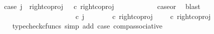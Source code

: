 \begin{isabellebody}
\ \ \ \ \ \ \isamarkupfalse%
\ \isamarkupfalse%
\ case{}{\isacharcolon}{\kern0pt}\ {\isachardoublequoteopen}j\ {\isacharequal}{\kern0pt}\ right{\isacharunderscore}{\kern0pt}coproj\ {\isasymone}\ {\isacharparenleft}{\kern0pt}{\isasymone}{\isasymCoprod}{\isasymone}{\isacharparenright}{\kern0pt}\ {\isasymcirc}\isactrlsub c\ right{\isacharunderscore}{\kern0pt}coproj\ {\isasymone}\ {\isasymone}{\isachardoublequoteclose}\isanewline
\ \ \ \ \ \ \ \ \isamarkupfalse%
\ case{}{\isacharunderscore}{\kern0pt}or{\isacharunderscore}{\kern0pt}{}\ \isamarkupfalse%
\ blast\isanewline
\ \ \ \ \ \ \isamarkupfalse%
\ {\isachardoublequoteopen}{\isasymlangle}{\isasymf}{\isacharcomma}{\kern0pt}\ {\isasymt}{\isasymrangle}\ {\isacharequal}{\kern0pt}\ {\isasymlangle}{\isasymf}{\isacharcomma}{\kern0pt}{\isasymf}{\isasymrangle}{\isachardoublequoteclose}\isanewline
\ \ \ \ \ \ \isamarkupfalse%
\ {\isacharminus}{\kern0pt}\ \isanewline
\ \ \ \ \ \ \ \ \isamarkupfalse%
\ {\isachardoublequoteopen}{\isacharparenleft}{\kern0pt}{\isasymlangle}{\isasymt}{\isacharcomma}{\kern0pt}\ {\isasymt}{\isasymrangle}{\isasymamalg}\ {\isacharparenleft}{\kern0pt}{\isasymlangle}{\isasymt}{\isacharcomma}{\kern0pt}\ {\isasymf}{\isasymrangle}\ {\isasymamalg}{\isasymlangle}{\isasymf}{\isacharcomma}{\kern0pt}\ {\isasymt}{\isasymrangle}{\isacharparenright}{\kern0pt}{\isacharparenright}{\kern0pt}\ {\isasymcirc}\isactrlsub c\ j\ {\isacharequal}{\kern0pt}\ {\isacharparenleft}{\kern0pt}{\isacharparenleft}{\kern0pt}{\isasymlangle}{\isasymt}{\isacharcomma}{\kern0pt}\ {\isasymt}{\isasymrangle}{\isasymamalg}\ {\isacharparenleft}{\kern0pt}{\isasymlangle}{\isasymt}{\isacharcomma}{\kern0pt}\ {\isasymf}{\isasymrangle}\ {\isasymamalg}{\isasymlangle}{\isasymf}{\isacharcomma}{\kern0pt}\ {\isasymt}{\isasymrangle}{\isacharparenright}{\kern0pt}{\isacharparenright}{\kern0pt}\ {\isasymcirc}\isactrlsub c\ right{\isacharunderscore}{\kern0pt}coproj\ {\isasymone}\ {\isacharparenleft}{\kern0pt}{\isasymone}\ {\isasymCoprod}\ {\isasymone}{\isacharparenright}{\kern0pt}{\isacharparenright}{\kern0pt}\ {\isasymcirc}\isactrlsub c\ right{\isacharunderscore}{\kern0pt}coproj\ {\isasymone}\ {\isasymone}{\isachardoublequoteclose}\isanewline
\ \ \ \ \ \ \ \ \ \ \isamarkupfalse%
\ {\isacharparenleft}{\kern0pt}typecheck{\isacharunderscore}{\kern0pt}cfuncs{\isacharcomma}{\kern0pt}\ simp\ add{\isacharcolon}{\kern0pt}\ case{}\ comp{\isacharunderscore}{\kern0pt}associative{}{\isacharparenright}{\kern0pt}\isanewline

\end{isabellebody}
